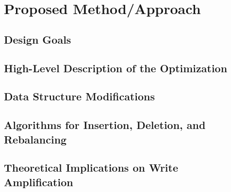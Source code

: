 \chapter{Proposed Method/Approach}
\section{Design Goals}
\section{High-Level Description of the Optimization}
\section{Data Structure Modifications}
\section{Algorithms for Insertion, Deletion, and Rebalancing}
\section{Theoretical Implications on Write Amplification}
